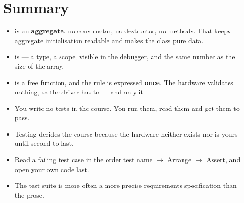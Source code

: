 \section*{Summary}

\begin{itemize}
  \item {} is an \textbf{aggregate}: no constructor, no destructor, no methods. That
    keeps aggregate initialisation readable and makes the class pure data.
  \item {} is  --- a type, a scope, visible in the debugger,
    and the same number as the size of the array.
  \item {} is a free function, and the rule is expressed \textbf{once}. The hardware
    validates nothing, so the driver has to --- and only it.
  \item You write no tests in the course. You run them, read them and get them to pass.
  \item Testing decides the course because the hardware neither exists nor is yours until second
    to last.
  \item Read a failing test case in the order test name $\rightarrow$ Arrange $\rightarrow$
    Assert, and open your own code last.
  \item The test suite is more often a more precise requirements specification than the prose.
\end{itemize}
